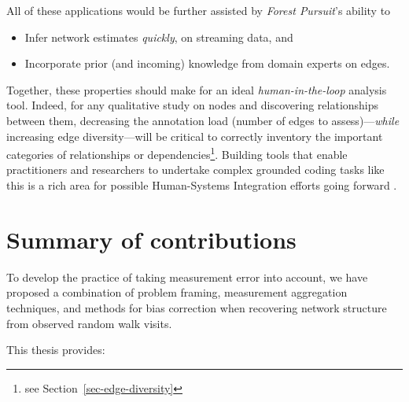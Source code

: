 \documentclass[%
	12pt,
		oneside,
		letterpaper
]{book}
\providecommand{\tightlist}{%
  \setlength{\itemsep}{0pt}\setlength{\parskip}{0pt}}\usepackage{longtable,booktabs,array}
\begin{document}
All of these applications would be further assisted by \emph{Forest Pursuit}'s ability to

\begin{itemize}
\tightlist
\item
  Infer network estimates \emph{quickly}, on streaming data, and
\item
  Incorporate prior (and incoming) knowledge from domain experts on edges.
\end{itemize}

Together, these properties should make for an ideal \emph{human-in-the-loop} analysis tool.
Indeed, for any qualitative study on nodes and discovering relationships between them, decreasing the annotation load (number of edges to assess)---\emph{while} increasing edge diversity---will be critical to correctly inventory the important categories of relationships or dependencies\footnote{see Section~\ref{sec-edge-diversity}}.
Building tools that enable practitioners and researchers to undertake complex grounded coding \autocite{codingmanualqualitative_Saldana2021} tasks like this is a rich area for possible Human-Systems Integration efforts going forward \autocite{Humanlooptechnical_Fung2024,AIInformedApproaches_Harper2022}.

\section{Summary of contributions}\label{summary-of-contributions}

To develop the practice of taking measurement error into account, we have proposed a combination of problem framing, measurement aggregation techniques, and methods for bias correction when recovering network structure from observed random walk visits.

This thesis provides:
\end{document}
